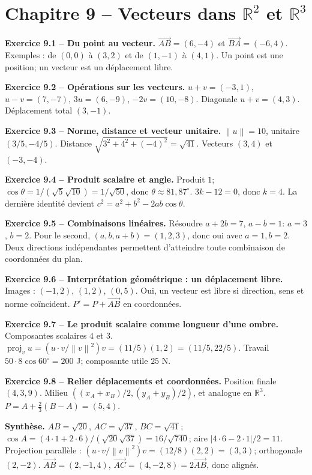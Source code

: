 \documentclass[11pt,a4paper,openany]{book}
\newcommand{\R}{\mathbb{R}}\newcommand{\N}{\mathbb{N}}\newcommand{\Z}{\mathbb{Z}}\newcommand{\Q}{\mathbb{Q}}
\newcommand{\vect}[1]{\overrightarrow{#1}}\newcommand{\norm}[1]{\left\lVert#1\right\rVert}\newcommand{\abs}[1]{\left\lvert#1\right\rvert}
\begin{document}
\chapter*{Chapitre 9 -- Vecteurs dans \texorpdfstring{$\R^2$ et $\R^3$}{R2 et R3}}
\begin{answerbox}
\textbf{Exercice 9.1 -- Du point au vecteur.} $\vect{AB}=(6,-4)$ et $\vect{BA}=(-6,4)$. Exemples : de $(0,0)$ à $(3,2)$ et de $(1,-1)$ à $(4,1)$. Un point est une position; un vecteur est un déplacement libre.\par
\textbf{Exercice 9.2 -- Opérations sur les vecteurs.} $u+v=(-3,1)$, $u-v=(7,-7)$, $3u=(6,-9)$, $-2v=(10,-8)$. Diagonale $u+v=(4,3)$. Déplacement total $(3,-1)$.\par
\textbf{Exercice 9.3 -- Norme, distance et vecteur unitaire.} $\norm u=10$, unitaire $(3/5,-4/5)$. Distance $\sqrt{3^2+4^2+(-4)^2}=\sqrt{41}$. Vecteurs $(3,4)$ et $(-3,-4)$.\par
\textbf{Exercice 9.4 -- Produit scalaire et angle.} Produit $1$; $\cos\theta=1/(\sqrt5\sqrt{10})=1/\sqrt{50}$, donc $\theta\approx81{,}87^\circ$. $3k-12=0$, donc $k=4$. La dernière identité devient $c^2=a^2+b^2-2ab\cos\theta$.\par
\textbf{Exercice 9.5 -- Combinaisons linéaires.} Résoudre $a+2b=7$, $a-b=1$: $a=3$, $b=2$. Pour le second, $(a,b,a+b)=(1,2,3)$, donc oui avec $a=1,b=2$. Deux directions indépendantes permettent d'atteindre toute combinaison de coordonnées du plan.\par
\textbf{Exercice 9.6 -- Interprétation géométrique : un déplacement libre.} Images : $(-1,2)$, $(1,2)$, $(0,5)$. Oui, un vecteur est libre si direction, sens et norme coïncident. $P'=P+\vect{AB}$ en coordonnées.\par
\textbf{Exercice 9.7 -- Le produit scalaire comme longueur d'une ombre.} Composantes scalaires $4$ et $3$. $\operatorname{proj}_v u=(u\cdot v/\norm v^2)v=(11/5)(1,2)=(11/5,22/5)$. Travail $50\cdot8\cos60^\circ=200$ J; composante utile $25$ N.\par
\textbf{Exercice 9.8 -- Relier déplacements et coordonnées.} Position finale $(4,3,9)$. Milieu $((x_A+x_B)/2,(y_A+y_B)/2)$, et analogue en $\R^3$. $P=A+\frac23(B-A)=(5,4)$.\par
\medskip\textbf{Synthèse.} $AB=\sqrt{20}$, $AC=\sqrt{37}$, $BC=\sqrt{41}$; $\cos A=(4\cdot1+2\cdot6)/(\sqrt{20}\sqrt{37})=16/\sqrt{740}$; aire $|4\cdot6-2\cdot1|/2=11$. Projection parallèle : $(u\cdot v/\norm v^2)v=(12/8)(2,2)=(3,3)$; orthogonale $(2,-2)$. $\vect{AB}=(2,-1,4)$, $\vect{AC}=(4,-2,8)=2\vect{AB}$, donc alignés.
\end{answerbox}
\end{document}
